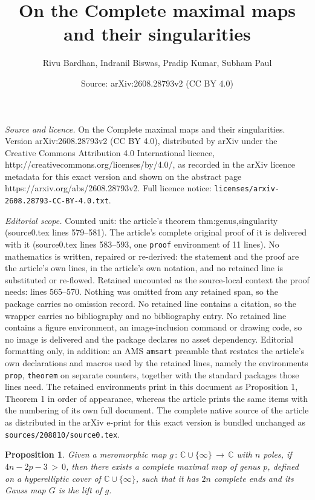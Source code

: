 \documentclass[10pt,a4paper]{amsart}
\title{On the Complete maximal maps and their singularities}
\author{Rivu Bardhan, Indranil Biswas, Pradip Kumar, Subham Paul}
\date{Source: arXiv:2608.28793v2 (CC BY 4.0)}
\newtheorem{prop}{Proposition}
\begin{document}
\maketitle

\noindent\emph{Source and licence.} On the Complete maximal maps and their singularities. Version arXiv:2608.28793v2 (CC BY 4.0), distributed by arXiv under the Creative Commons Attribution 4.0 International licence, http://creativecommons.org/licenses/by/4.0/, as recorded in the arXiv licence metadata for this exact version and shown on the abstract page https://arxiv.org/abs/2608.28793v2. Full licence notice: \texttt{licenses/arxiv-2608.28793-CC-BY-4.0.txt}.\par\smallskip

\noindent\textit{Editorial scope.} Counted unit: the article's theorem thm:genus,singularity (source0.tex lines 579--581). The article's complete original proof of it is delivered with it (source0.tex lines 583--593, one \texttt{proof} environment of 11 lines). No mathematics is written, repaired or re-derived: the statement and the proof are the article's own lines, in the article's own notation, and no retained line is substituted or re-flowed.  Retained uncounted as the source-local context the proof needs: lines 565--570.  Nothing was omitted from any retained span, so the package carries no omission record.  No retained line contains a citation, so the wrapper carries no bibliography and no bibliography entry.  No retained line contains a figure environment, an image-inclusion command or drawing code, so no image is delivered and the package declares no asset dependency.  Editorial formatting only, in addition: an AMS \texttt{amsart} preamble that restates the article's own declarations and macros used by the retained lines, namely the environments \texttt{prop}, \texttt{theorem} on separate counters, together with the standard packages those lines need.  The retained environments print in this document as Proposition 1, Theorem 1 in order of appearance, whereas the article prints the same items with the numbering of its own full document.  The complete native source of the article as distributed in the arXiv e-print for this exact version is bundled unchanged as \texttt{sources/208810/source0.tex}.
\begin{prop}\label{prop:exsistece of maximal map}
Given a meromorphic map \(g\,:\, \mathbb{C} \cup \{\infty\}\, \longrightarrow\, \mathbb{C}\) with \(n\) poles, 
if \( 4n-2p-3 \,> \, 0\), then there exists a complete maximal map of genus \(p\), defined on a hyperelliptic cover 
of \(\mathbb{C} \cup \{\infty\}\), such that it has \(2n\) complete ends and its Gauss map \(G\) is the lift of 
\(g\).
\end{prop}
\end{document}
